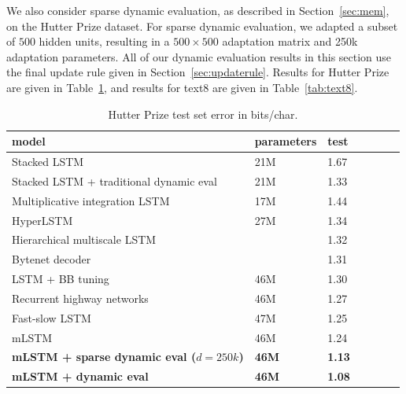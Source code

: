 \documentclass{article}
\begin{document}
We also consider sparse dynamic evaluation, as described in Section~\ref{sec:mem}, on the Hutter Prize dataset. For sparse dynamic evaluation, we adapted a subset of $500$ hidden units, resulting in a $500\!\times\!500$ adaptation matrix and 250k adaptation parameters. All of our dynamic evaluation results in this section use the final update rule given in Section~\ref{sec:updaterule}. Results for Hutter Prize are given in Table~\ref{tab:hutter}, and results for text8 are given in Table~\ref{tab:text8}.
\begin{table}[tb]
\begin{center} 
\begin{tabular}{  l  l  l  l  l  l  l } \toprule 
model &  parameters & test \\ 
\midrule 
Stacked LSTM \citep{Graves-2013}  & 21M& 1.67 \\ 
Stacked LSTM + traditional dynamic eval \citep{Graves-2013} & 21M &1.33 \\ 
Multiplicative integration LSTM \citep{wu2016} &17M&1.44 \\  
HyperLSTM  \citep{Ha2017} & 27M&1.34\\   
Hierarchical multiscale LSTM \citep{chung2017} & & 1.32 \\  
Bytenet decoder \citep{Kalchbrenner2016}& & 1.31\\  
LSTM + BB tuning \citep{melis2017}& 46M & 1.30\\
Recurrent highway networks \citep{zilly2017} & 46M &1.27\\
Fast-slow LSTM \citep{mujika2017} & 47M & 1.25\\
\midrule 
mLSTM \citep{krause2016} & 46M & 1.24 \\
\textbf{mLSTM + sparse dynamic eval ($d=250k$)} & \textbf{46M} &\textbf{1.13}\\ 
\textbf{mLSTM + dynamic eval } & \textbf{46M} &\textbf{1.08}\\ 
\bottomrule
\end{tabular} 
\end{center}
\caption{Hutter Prize test set error in bits/char.}
\label{tab:hutter}
\end{table}
\end{document}
